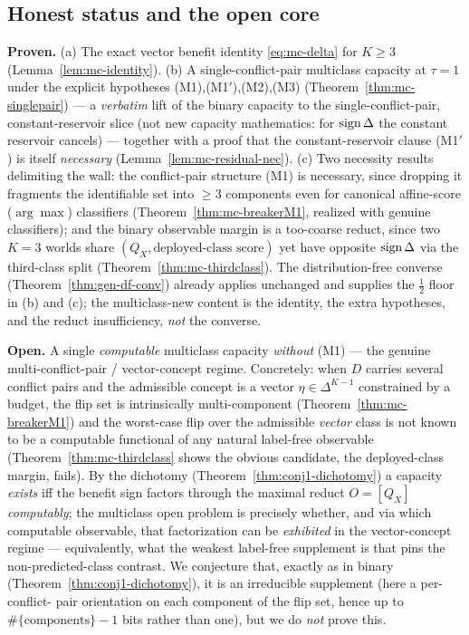\subsection{Honest status and the open core}\label{sec:mc-open}
\begin{remark}\label{rmk:mc-scope}
\textbf{Proven.} (a) The exact vector benefit identity \eqref{eq:mc-delta} for $K\ge3$
(Lemma~\ref{lem:mc-identity}). (b) A single-conflict-pair multiclass capacity at $\tau=1$
under the explicit hypotheses (M1),(M1$'$),(M2),(M3) (Theorem~\ref{thm:mc-singlepair}) ---
a \emph{verbatim} lift of the binary capacity to the single-conflict-pair, constant-reservoir
slice (not new capacity mathematics: for $\operatorname{sign}\Delta$ the constant reservoir cancels) --- together
with a proof that the constant-reservoir clause (M1$'$) is itself \emph{necessary}
(Lemma~\ref{lem:mc-residual-nec}). (c) Two necessity
results delimiting the wall: the conflict-pair structure (M1) is necessary, since dropping
it fragments the identifiable set into $\ge3$ components even for canonical affine-score
($\arg\max$) classifiers (Theorem~\ref{thm:mc-breakerM1}, realized with genuine
classifiers); and the binary observable margin is a too-coarse reduct, since two $K=3$
worlds share $(Q_X,\text{deployed-class score})$ yet have opposite $\operatorname{sign}\Delta$ via the
third-class split (Theorem~\ref{thm:mc-thirdclass}). The distribution-free converse
(Theorem~\ref{thm:gen-df-conv}) already applies unchanged and supplies the $\tfrac12$ floor
in (b) and (c); the multiclass-new content is the identity, the extra hypotheses, and the
reduct insufficiency, \emph{not} the converse.

\textbf{Open.} A single \emph{computable} multiclass capacity \emph{without} (M1) --- the
genuine multi-conflict-pair / vector-concept regime. Concretely: when $D$ carries several
conflict pairs and the admissible concept is a vector $\eta\in\Delta^{K-1}$ constrained by a
budget, the flip set is intrinsically multi-component (Theorem~\ref{thm:mc-breakerM1}) and
the worst-case flip over the admissible \emph{vector} class is not known to be a computable
functional of any natural label-free observable (Theorem~\ref{thm:mc-thirdclass} shows the
obvious candidate, the deployed-class margin, fails). By the dichotomy
(Theorem~\ref{thm:conj1-dichotomy}) a capacity \emph{exists} iff the benefit sign factors through
the maximal reduct $O=[Q_X]$ \emph{computably}; the multiclass open problem is precisely
whether, and via which computable observable, that factorization can be \emph{exhibited} in
the vector-concept regime --- equivalently, what the weakest label-free supplement is that
pins the non-predicted-class contrast. We conjecture that, exactly as in binary
(Theorem~\ref{thm:conj1-dichotomy}), it is an irreducible supplement (here a per-conflict-
pair orientation on each component of the flip set, hence up to $\#\{\text{components}\}-1$
bits rather than one), but we do \emph{not} prove this.


\end{remark}
